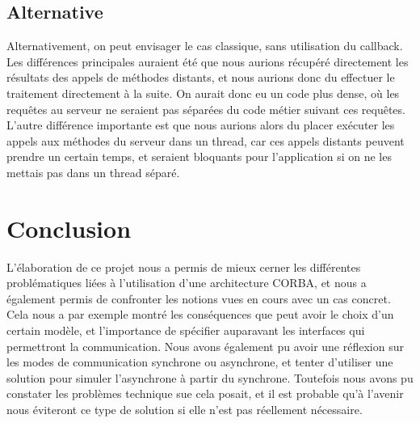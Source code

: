 \documentclass[a4paper, french, 11pt]{report}
\begin{document}
\section{Alternative}

Alternativement, on peut envisager le cas classique, sans utilisation du callback. Les différences principales auraient été que nous aurions récupéré directement les résultats des appels de méthodes distants, et nous aurions donc du effectuer le traitement directement à la suite. On aurait donc eu un code plus dense, où les requêtes au serveur ne seraient pas séparées du code métier suivant ces requêtes. L'autre différence importante est que nous aurions alors du placer exécuter les appels aux méthodes du serveur dans un thread, car ces appels distants peuvent prendre un certain temps, et seraient bloquants pour l'application si on ne les mettais pas dans un thread séparé.



\chapter*{Conclusion}

L'élaboration de ce projet nous a permis de mieux cerner les différentes problématiques liées à l'utilisation d'une architecture CORBA, et nous a également permis de confronter les notions vues en cours avec un cas concret. Cela nous a par exemple montré les conséquences que peut avoir le choix d'un certain modèle, et l'importance de spécifier auparavant les interfaces qui permettront la communication. Nous avons également pu avoir une réflexion sur les modes de communication synchrone ou asynchrone, et tenter d'utiliser une solution pour simuler l'asynchrone à partir du synchrone. Toutefois nous avons pu constater les problèmes technique sue cela posait, et il est probable qu'à l'avenir nous éviteront ce type de solution si elle n'est pas réellement nécessaire.
\end{document}
